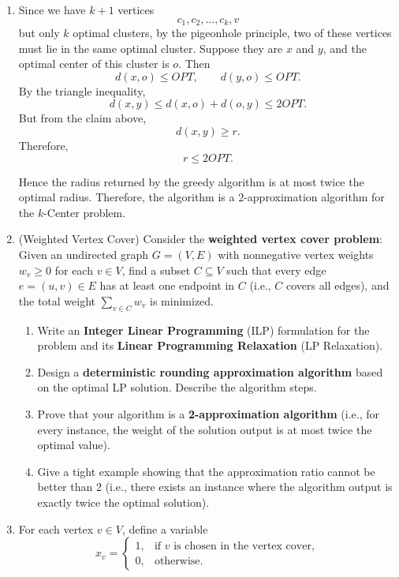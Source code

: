 \documentclass[12pt,a4paper]{article}
\makeatletter
\newtheorem*{solution}{Solution}
\theoremstyle{definition}
\renewenvironment{solution}[1][Solution] {\par\pushQED{\qed}\normalfont\topsep6\p@\@plus6\p@\relax\trivlist\item[\hskip\labelsep\bfseries#1\@addpunct{.}]\ignorespaces}{\popQED\endtrivlist\@endpefalse} \makeatother
\makeatother
\begin{document}
\begin{enumerate}
\begin{solution}
    Since we have \(k+1\) vertices
    \[
    c_1,c_2,\ldots,c_k,v
    \]
    but only \(k\) optimal clusters, by the pigeonhole principle, two of these vertices must lie in the same optimal cluster. Suppose they are \(x\) and \(y\), and the optimal center of this cluster is \(o\). Then
    \[
    d(x,o)\le OPT,\qquad d(y,o)\le OPT.
    \]
    By the triangle inequality,
    \[
    d(x,y)\le d(x,o)+d(o,y)\le 2OPT.
    \]
    But from the claim above,
    \[
    d(x,y)\ge r.
    \]
    Therefore,
    \[
    r\le 2OPT.
    \]
    
    Hence the radius returned by the greedy algorithm is at most twice the optimal radius. Therefore, the algorithm is a \(2\)-approximation algorithm for the \(k\)-Center problem.
    \end{solution}


  \item {\color{purple}(Weighted Vertex Cover)} Consider the \textbf{weighted vertex cover problem}: Given an undirected graph $G=(V,E)$ with nonnegative vertex weights $w_v \ge 0$ for each $v \in V$, find a subset $C \subseteq V$ such that every edge $e=(u,v)\in E$ has at least one endpoint in $C$ (i.e., $C$ covers all edges), and the total weight $\sum_{v\in C} w_v$ is minimized.

\begin{enumerate}
    \item Write an \textbf{Integer Linear Programming} (ILP) formulation for the problem and its \textbf{Linear Programming Relaxation} (LP Relaxation).
    \item Design a \textbf{deterministic rounding approximation algorithm} based on the optimal LP solution. Describe the algorithm steps.
    \item Prove that your algorithm is a \textbf{2-approximation algorithm} (i.e., for every instance, the weight of the solution output is at most twice the optimal value).
    \item Give a tight example showing that the approximation ratio cannot be better than 2 (i.e., there exists an instance where the algorithm output is exactly twice the optimal solution).
\end{enumerate}


  
  \begin{solution}
    For each vertex \(v\in V\), define a variable
    \[
    x_v=
    \begin{cases}
    1, & \text{if } v \text{ is chosen in the vertex cover},\\
    0, & \text{otherwise}.
    \end{cases}
    \]
    

\end{solution}
\end{enumerate}
\end{document}
